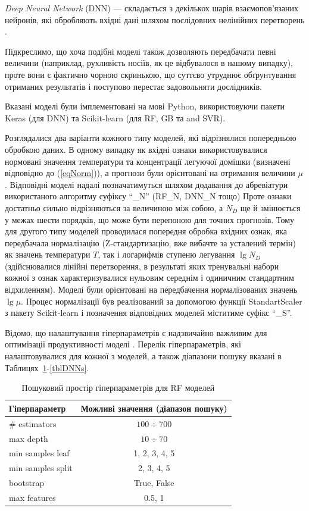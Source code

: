\documentclass[10pt,a5paper,titlepage,oneside]{book}
\numberwithin{equation}{part}
\begin{document}
\noindent
\emph{Deep Neural Network} (DNN) --- складається з декількох шарів взаємопов'язаних нейронів, які обробляють вхідні дані
шляхом послідовних нелінійних перетворень \cite{Liu2023}.

Підкреслимо, що хоча подібні моделі також дозволяють передбачати певні величини (наприклад, рухливість носіїв,
як це відбувалося в нашому випадку), проте вони є фактично чорною скринькою, що суттєво утруднює обґрунтування отриманих результатів
і поступово перестає задовольняти дослідників.


Вказані моделі були імплементовані на мові Python,
використовуючи пакети Keras (для DNN) та Scikit-learn (для RF, GB та and SVR).

Розглядалися два варіанти кожного типу моделей, які відрізнялися попередньою обробкою даних.
В одному випадку як вхідні ознаки використовувалися нормовані значення температури та концентрації легуючої домішки
(визначені відповідно до (\ref{eqNorm})), а прогнози були орієнтовані на отримання величини $\mu$.
Відповідні моделі надалі позначатимуться шляхом додавання до абревіатури використаного алгоритму суфіксу ``\_N'' (RF\_N, DNN\_N тощо)
Проте ознаки достатньо сильно відрізняються за величиною між собою, а $N_D$ ще й змінюється у межах шести порядків,
що може бути перепоною для точних прогнозів. 
Тому для другого типу моделей проводилася попередня обробка вхідних ознак, яка передбачала нормалізацію (Z-стандартизацію, вже вибачте за усталений термін)
як значень температури $T$,
так і логарифмів ступеню легування $\lg N_D$ 
(здійснювалися лінійні перетворення, в результаті яких тренувальні набори кожної з ознак характеризувалися нульовим середнім і одиничним стандартним відхиленням).
Моделі були орієнтовані на передбачення нормалізованих значень $\lg \mu$.
Процес нормалізації був реалізований за допомогою функції StandartScaler з пакету Scikit-learn і позначення відповідних моделей міститиме суфікс ``\_S''.

Відомо, що налаштування гіперпараметрів  є надзвичайно важливим для оптимізації продуктивності моделі \cite{Hanif2024}.
Перелік гіперпараметрів, які налаштовувалися для кожної з моделей, а також діапазони пошуку вказані в Таблицях~\ref{tblRFs}-\ref{tblDNNs}.


\begin{table}
\caption{Пошуковий простір гіперпараметрів для RF моделей }
\label{tblRFs}
\centering
\begin{tabular}{|l|c|}
\hline
Гіперпараметр&Можливі значення (діапазон пошуку)\\
\hline
\# estimators&	$100\div700$\\
\hline
max depth&	$10\div70$\\
\hline
min samples leaf &	1, 2, 3, 4, 5\\
\hline
min samples split	&2, 3, 4, 5\\
\hline
bootstrap	& True, False \\
\hline
max features &	0.5, 1\\
\hline
\end{tabular}
\end{table}
\end{document}
